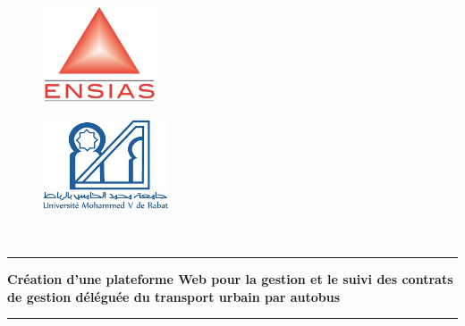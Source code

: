 \documentclass[a4paper]{report}
\begin{document}
\begin{titlepage}
	\begin{center}
		\begin{figure}[!h]
			\vspace{- 2 cm}
			\hspace{ 0 cm}
			\includegraphics[width=9em]{images/ensias.jpeg}
		\end{figure}
		\begin{figure}[!h]
			\vspace{- 3.34cm}
			\hspace{15cm}
			\includegraphics[width=10em]{images/um5.jpeg}
		\end{figure}
	\end{center}

	\begin{center}
		\begin{center}
			\noindent {}\\
		\end{center}
		\begin{center}
			\rule{0.9\linewidth}{1pt}
		\end{center}
		\vspace*{0.2cm}
		\noindent \hspace{ 0.3 cm }\Huge \textbf{Création d'une
			plateforme Web pour la gestion et le suivi des contrats de gestion déléguée du transport urbain par autobus}
		\begin{center}
			\rule{0.9\linewidth}{1pt}
		\end{center}


\end{center}
\end{titlepage}
\end{document}
